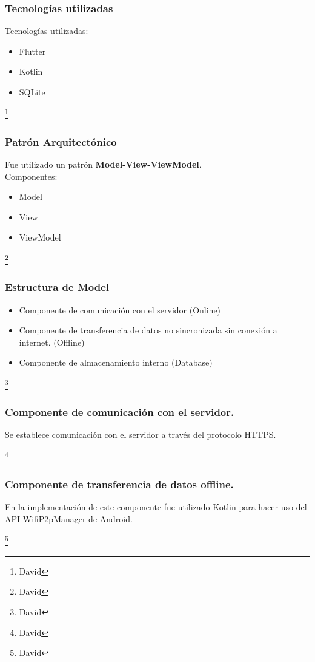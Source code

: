 \documentclass[14pt]{beamer}
\begin{document}
\begin{frame}
\frametitle{Tecnologías utilizadas}

Tecnologías utilizadas:
\begin{itemize}
\item Flutter
\item Kotlin
\item SQLite
\end{itemize}
\footnote{David}
\end{frame}


\begin{frame}
\frametitle{Patrón Arquitectónico}

Fue utilizado un patrón \textbf{Model-View-ViewModel}.
\\
Componentes:
\begin{itemize}
\item Model
\item View
\item ViewModel
\end{itemize}

\footnote{David}
\end{frame}





\begin{frame}
\frametitle{Estructura de Model}

\begin{itemize}
\item Componente de comunicación con el servidor (Online)

\item Componente de transferencia de datos no sincronizada sin conexión a internet. (Offline)

\item Componente de almacenamiento interno (Database)

\end{itemize}

\footnote{David}
\end{frame}

\begin{frame}
\frametitle{Componente de comunicación con el servidor.}

\begin{block}{}
Se establece comunicación con el servidor a través del protocolo HTTPS.
\end{block}
\footnote{David}
\end{frame}

\begin{frame}
\frametitle{Componente de transferencia de datos offline.}

\begin{block}{}
En la implementación de este componente fue utilizado Kotlin para hacer uso del API WifiP2pManager de Android.
\end{block}
\footnote{David}
\end{frame}
\end{document}
